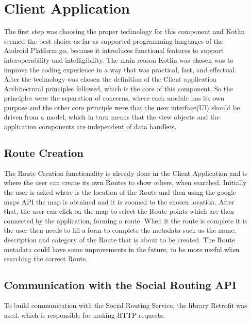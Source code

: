 \documentclass{article}
\begin{document}
    \section{Client Application}
        The first step was choosing the proper technology\cite{technologiesclientdocs} for this component and Kotlin \cite{kotlinwebsite} seemed the best choice as far as supported programming languages 
        of the Android Platform go, because it introduces functional features to support interoperability and intelligibility. The main reason Kotlin was chosen was to improve the coding experience in a way that was practical, fast, and effectual.
        After the technology was chosen the definition of the Client application\cite{clientapplicationdocs} Architectural principles followed, which is the core of this component. 
        So the principles were the separation of concerns, where each module has its own purpose and the other core principle were that the user interface(UI) 
        should be driven from a model, which in turn means that the view objects and the application components are independent of data handlers.
        
        
        \subsection*{Route Creation}
            The Route Creation functionality is already done in the Client Application and is where the user can create its own Routes to show others, when searched. 
            Initially the user is asked where is the location of the Route and then using the google maps API the map is obtained and it is zoomed to the chosen location. 
            After that, the user can click on the map to select the Route points which are then connected by the application, forming a route. When it the route is complete it is 
            the user then needs to fill a form to complete the metadata such as the name, description and category of the Route that is about to be created. 
            The Route metadata could have some improvements in the future, to be more useful when searching the correct Route.
    
        \subsection*{Communication with the Social Routing API}
            To build communication with the Social Routing Service\cite{communicationwithexternalapis}, the library Retrofit\cite{retrofit} was used, which is responsible for making HTTP \cite{httponlinedocs} requests. 
            \newpage
\end{document}
